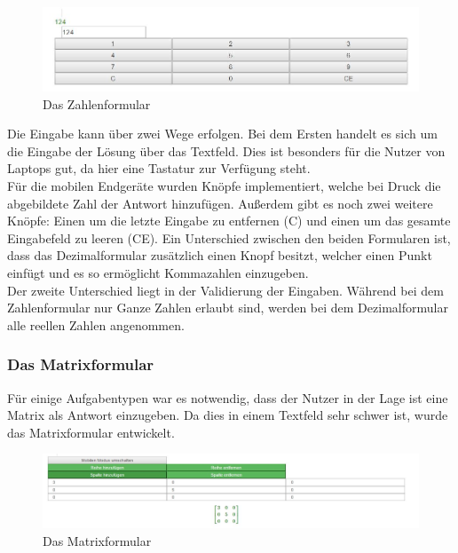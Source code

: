 \begin{figure}[htp]     %
\centering
\includegraphics[width=1\textwidth]{bilder/NumberForm} 
\caption[Das Zahlenformular]{Das Zahlenformular}
\end{figure} 

Die Eingabe kann über zwei Wege erfolgen. Bei dem Ersten handelt es sich um die Eingabe der Lösung über das Textfeld. Dies ist besonders für die Nutzer von Laptops gut, da hier eine Tastatur zur Verfügung steht. \\
Für die mobilen Endgeräte wurden Knöpfe implementiert, welche bei Druck die abgebildete Zahl der Antwort hinzufügen. Außerdem gibt es noch zwei weitere Knöpfe: Einen um die letzte Eingabe zu entfernen (C) und einen um das gesamte Eingabefeld zu leeren (CE). Ein Unterschied zwischen den beiden Formularen ist, dass das Dezimalformular zusätzlich einen Knopf besitzt, welcher einen Punkt einfügt und es so ermöglicht Kommazahlen einzugeben. \\
Der zweite Unterschied liegt in der Validierung der Eingaben. Während bei dem Zahlenformular nur Ganze Zahlen erlaubt sind, werden bei dem Dezimalformular alle reellen Zahlen angenommen.

\subsubsection{Das Matrixformular}

Für einige Aufgabentypen war es notwendig, dass der Nutzer in der Lage ist eine Matrix als Antwort einzugeben. Da dies in einem Textfeld sehr schwer ist, wurde das Matrixformular entwickelt. \\

\begin{figure}[htp]     %
\centering
\includegraphics[width=1\textwidth]{bilder/MatrixForm} 
\caption[Das Matrixformular]{Das Matrixformular}
\end{figure} 

